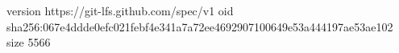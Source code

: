 version https://git-lfs.github.com/spec/v1
oid sha256:067e4ddde0efc021febf4e341a7a72ee4692907100649e53a444197ae53ae102
size 5566
